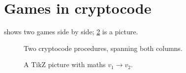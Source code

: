 \documentclass[twocolumn]{article}
\begin{document}
\section{Games in cryptocode}\label{sec:cc}
 shows two games side by side; \cref{fig:tikz} is a picture.

\begin{figure}[t]
\centering
{}
\hfill
{}
\caption{Two cryptocode procedures, spanning both columns.}\label{fig:cc}
\end{figure}

\begin{figure}[t]
\centering
{}
\caption{A TikZ picture with maths $v_1\to v_2$.}\label{fig:tikz}
\end{figure}
\end{document}
